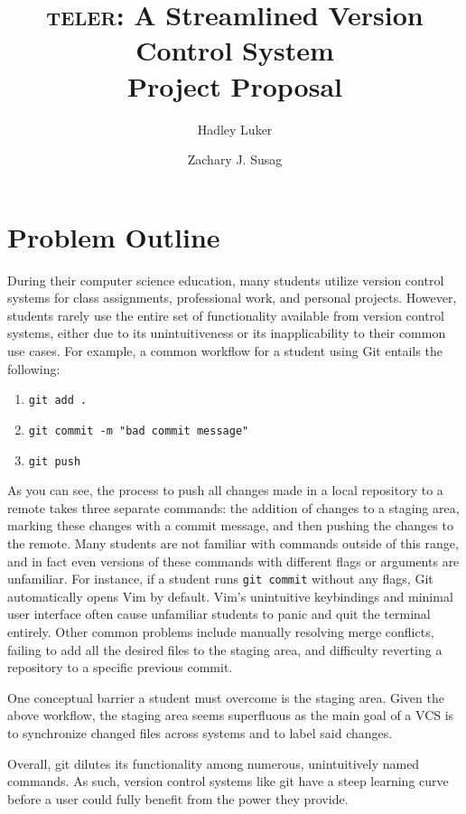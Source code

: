 \documentclass[12pt, letterpaper]{article}
\begin{document}
\title{
  \textsc{teler}: A Streamlined Version Control System\\
  \large Project Proposal
}

\author{
  Hadley Luker \and Zachary J. Susag
}

\maketitle

\section{Problem Outline}
\label{sec:problem}
During their computer science education, many students utilize version
control systems for class assignments, professional work, and personal
projects. However, students rarely use the entire set of functionality
available from version control systems, either due to its
unintuitiveness or its inapplicability to their common use cases. For
example, a common workflow for a student using Git entails the
following:
\begin{enumerate}
\item \texttt{git add .}
\item \texttt{git commit -m "bad commit message"}
\item \texttt{git push}
\end{enumerate}
As you can see, the process to push all changes made in a local
repository to a remote takes three separate commands: the addition of changes to a
staging area, marking these changes with a commit message, and then
pushing the changes to the remote. Many students are not familiar with
commands outside of this range, and in fact even versions of these
commands with different flags or arguments are unfamiliar. For
instance, if a student runs \texttt{git commit} without any flags, Git
automatically opens Vim by default. Vim's unintuitive keybindings and
minimal user interface often cause unfamiliar students to panic and
quit the terminal entirely. Other common problems include manually
resolving merge conflicts, failing to add all the desired files to the
staging area, and difficulty reverting a repository to a specific
previous commit.

One conceptual barrier a student must overcome is the staging area.
Given the above workflow, the staging area seems
superfluous as the main goal of a VCS is to synchronize
changed files across systems and to label said changes.

Overall, git dilutes its functionality among numerous, unintuitively
named commands. As such, version control systems like git have a steep
learning curve before a user could fully benefit from the power they provide.
\end{document}

